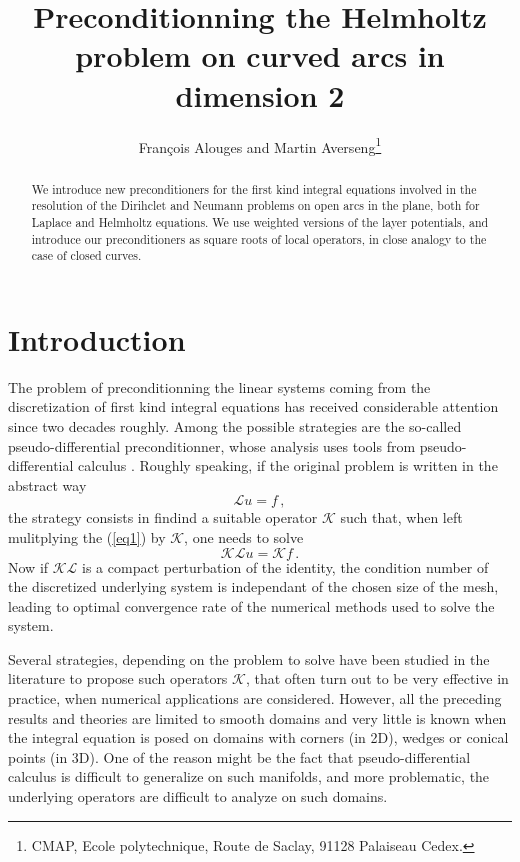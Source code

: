 \documentclass[a4paper]{article}
\title{Preconditionning the Helmholtz problem on curved arcs in dimension 2}
\author{Fran\c{c}ois Alouges and Martin Averseng\footnote{CMAP, Ecole polytechnique, Route de Saclay, 91128 Palaiseau Cedex.}}
\begin{document}
	\maketitle
	
	\begin{abstract}
		We introduce new preconditioners for the first kind integral equations involved in the resolution of the Dirihclet and Neumann problems on open arcs in the plane, both for Laplace and Helmholtz equations. We use weighted versions of the layer potentials, and introduce our preconditioners as square roots of local operators, in close analogy to the case of closed curves. 
	\end{abstract}
	
	\section*{Introduction}
	The problem of preconditionning the linear systems coming from the discretization of first kind integral equations
	has received considerable attention since two decades roughly. Among the possible strategies are the so-called 
	pseudo-differential preconditionner, whose analysis uses tools from pseudo-differential calculus \cite{Christiansen,Nedelec,Levadoux,DarbasAntoine}. Roughly speaking, if the original problem is written in the abstract way
	\begin{equation}
	\mathcal{L}u=f\,,
	\label{eq1}
	\end{equation}
	the strategy consists in findind a suitable operator $\mathcal{K}$ such
	that, when left mulitplying the (\ref{eq1}) by $\mathcal{K}$, one needs to solve
	\begin{equation}
	\mathcal{K}\mathcal{L}u=\mathcal{K}f\,.
	\end{equation}
	Now if $\mathcal{K}\mathcal{L}$ is a compact perturbation of the identity, the condition number of the discretized underlying
	system is independant of the chosen size of the mesh, leading to optimal convergence rate of the numerical methods used to solve the system.
	
	Several strategies, depending on the problem to solve have been studied in the literature \cite{} to propose such operators $\mathcal{K}$, that often turn out to be very effective in practice, when numerical applications are considered.
	However, all the preceding results and theories are limited to smooth domains and very little is known when the integral equation 
	is posed on domains with corners (in 2D), wedges or conical points (in 3D). One of the reason might be the fact that 
	pseudo-differential calculus is difficult to generalize on such manifolds, and more problematic, the underlying operators
	are difficult to analyze on such domains.
	
\end{document}
